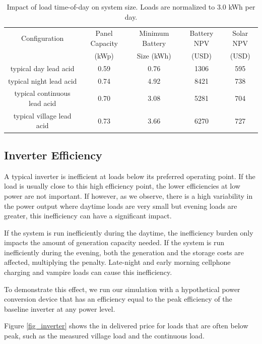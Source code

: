 \documentclass[conference]{IEEEtran}
\begin{document}
\begin{table}
\centering
\begin{tabular}{c c c c c}
Configuration & Panel Capacity & Minimum Battery & Battery NPV & Solar NPV \\
              & (kWp)          & Size (kWh)      & (USD)       & (USD)     \\
\hline
typical day lead acid          & 0.59 & 0.76 & 1306 & 595 \\
typical night lead acid        & 0.74 & 4.92 & 8421 & 738 \\
typical continuous lead acid   & 0.70 & 3.08 & 5281 & 704 \\
typical village lead acid      & 0.73 & 3.66 & 6270 & 727 \\
\end{tabular}
\caption{Impact of load time-of-day on system size.
Loads are normalized to 3.0 kWh per day.}
\label{tbl_baseline}
\end{table}

\subsection{Inverter Efficiency}

A typical inverter is inefficient at loads below its
preferred operating point.
If the load is usually close to this high efficiency
point, the lower efficiencies at low power are not important.
If however, as we observe, there is a high variability
in the power output where daytime loads are very small
but evening loads are greater, this inefficiency can have
a significant impact.

If the system is run inefficiently during the daytime, the inefficiency
burden only impacts the amount of generation capacity needed.
If the system is run inefficiently during the evening, both the
generation and the storage costs are affected, multiplying the
penalty.
Late-night and early morning cellphone charging and vampire
loads can cause this inefficiency.

To demonstrate this effect, we run our simulation with
a hypothetical power conversion device that has an
efficiency equal to the peak efficiency of the baseline
inverter at any power level.

Figure \ref{fig_inverter}
shows the in delivered price for loads that
are often below peak, such as the measured village load
and the continuous load.
\end{document}

